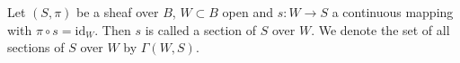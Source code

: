 Let $(S, \pi)$ be a sheaf over $B$, $W \subset B$ open and $s: W \rightarrow S$ a continuous mapping with $\pi \circ s = \text{id}_W$. Then $s$ is called a section of $S$ over $W$. We denote the set of all sections of $S$ over $W$ by $\Gamma(W, S)$.
